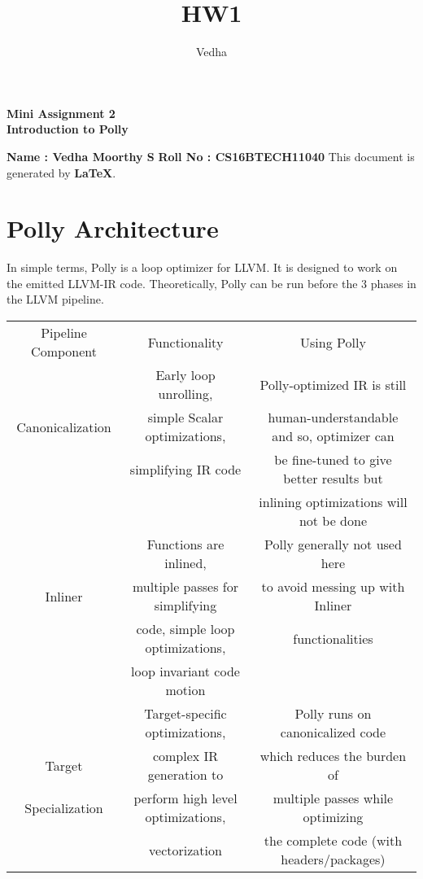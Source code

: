 \documentclass{article}
\title{HW1}
\author{Vedha}
\begin{document}
\huge
\begin{center}
	\textbf{Mini Assignment 2} \\
	\textbf{Introduction to Polly}
\end{center}
\bigbreak
\large
\textbf{ } \hfill \break
\textbf{Name : Vedha Moorthy S} \hfill \break
\textbf{Roll No : CS16BTECH11040} \hfill \break
This document is generated by \textbf{\LaTeX}. \hfill \break
\normalsize

\section{Polly Architecture}
\hspace{10mm} In simple terms, Polly is a loop optimizer for LLVM. It is designed to work on the emitted LLVM-IR code.
Theoretically, Polly can be run before the 3 phases in the LLVM pipeline.

\begin{center}
 \begin{tabular}{| c | c | c |}
 \hline
 Pipeline Component & Functionality & Using Polly \\ [0.4ex]
 \Xhline{1pt}
 & Early loop unrolling, & Polly-optimized IR is still \\
 Canonicalization & simple Scalar optimizations,  & human-understandable and so, optimizer can \\
 & simplifying IR code & be fine-tuned to give better results but \\
 && inlining optimizations will not be done \\
 \hline
 & Functions are inlined, & Polly generally not used here \\
 Inliner & multiple passes for simplifying & to avoid messing up with Inliner \\
 & code, simple loop optimizations, & functionalities\\
 & loop invariant code motion & \\
 \hline
 & Target-specific optimizations, & Polly runs on canonicalized code \\
 Target & complex IR generation to & which reduces the burden of \\
 Specialization & perform high level optimizations, & multiple passes while optimizing \\
 & vectorization & the complete code (with headers/packages) \\
 \hline
 \end{tabular}
\end{center}
\hfill \break
\end{document}
